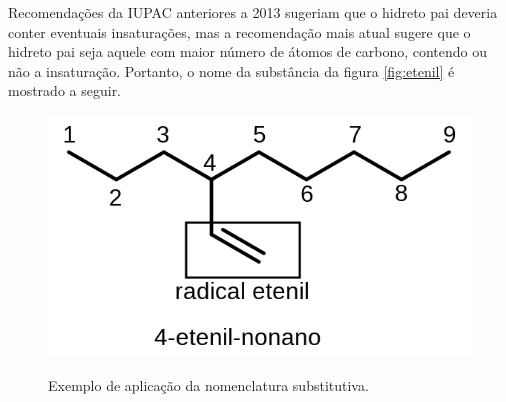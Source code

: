 Recomendações da IUPAC anteriores a 2013 sugeriam que o hidreto pai deveria conter eventuais insaturações, mas a recomendação mais atual sugere que o hidreto pai seja aquele com maior número de átomos de carbono, contendo ou não a insaturação. Portanto, o nome da substância da figura \ref{fig:etenil} é mostrado a seguir.

\begin{figure}[H]
	\centering
	\caption{Exemplo de aplicação da nomenclatura substitutiva.}
	\vspace{0.5cm}
	\includegraphics[width=0.6\linewidth]{imagens/nomeetenil.png}
\label{fig:nomeetenil}
\end{figure}